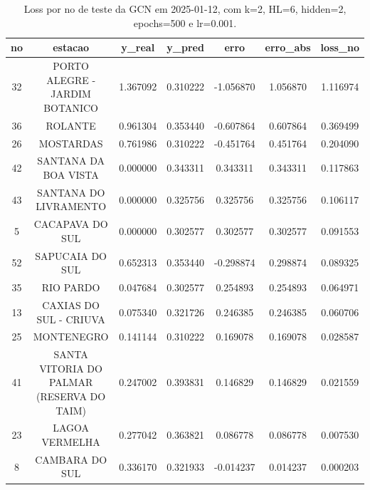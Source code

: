 \begin{table}[h]
\centering
\caption{Loss por no de teste da GCN em 2025-01-12, com k=2, HL=6, hidden=2, epochs=500 e lr=0.001.}
\label{tab:gcn_loss_k2_hl6_h2_e500_d20250112}
\begin{tabular}{ccccccc}
\toprule
no & estacao & y\_real & y\_pred & erro & erro\_abs & loss\_no \\
\midrule
32 & PORTO ALEGRE - JARDIM BOTANICO & 1.367092 & 0.310222 & -1.056870 & 1.056870 & 1.116974 \\
36 & ROLANTE & 0.961304 & 0.353440 & -0.607864 & 0.607864 & 0.369499 \\
26 & MOSTARDAS & 0.761986 & 0.310222 & -0.451764 & 0.451764 & 0.204090 \\
42 & SANTANA DA BOA VISTA & 0.000000 & 0.343311 & 0.343311 & 0.343311 & 0.117863 \\
43 & SANTANA DO LIVRAMENTO & 0.000000 & 0.325756 & 0.325756 & 0.325756 & 0.106117 \\
5 & CACAPAVA DO SUL & 0.000000 & 0.302577 & 0.302577 & 0.302577 & 0.091553 \\
52 & SAPUCAIA DO SUL & 0.652313 & 0.353440 & -0.298874 & 0.298874 & 0.089325 \\
35 & RIO PARDO & 0.047684 & 0.302577 & 0.254893 & 0.254893 & 0.064971 \\
13 & CAXIAS DO SUL - CRIUVA & 0.075340 & 0.321726 & 0.246385 & 0.246385 & 0.060706 \\
25 & MONTENEGRO & 0.141144 & 0.310222 & 0.169078 & 0.169078 & 0.028587 \\
41 & SANTA VITORIA DO PALMAR (RESERVA DO TAIM) & 0.247002 & 0.393831 & 0.146829 & 0.146829 & 0.021559 \\
23 & LAGOA VERMELHA & 0.277042 & 0.363821 & 0.086778 & 0.086778 & 0.007530 \\
8 & CAMBARA DO SUL & 0.336170 & 0.321933 & -0.014237 & 0.014237 & 0.000203 \\
\bottomrule
\end{tabular}
\end{table}
